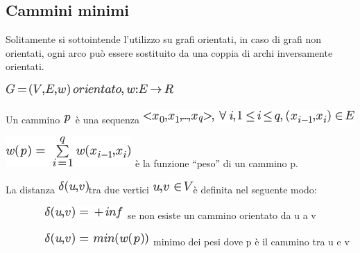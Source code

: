 \documentclass{article}
\begin{document}
{}

\subsection{\texorpdfstring{{Cammini
minimi}}{Cammini minimi}}\label{h.yl5v086nw9el}

{Solitamente si sottointende l'utilizzo su grafi orientati, in caso di
grafi non orientati, ogni arco può essere sostituito da una coppia di
archi inversamente orientati.}

{}

\includegraphics{images/image490.png}

{}

{Un cammino }\includegraphics{images/image491.png}{~è una sequenza
}\includegraphics{images/image492.png}

\includegraphics{images/image493.png}{~è la funzione ``peso'' di un
cammino p.}

{}

{La distanza }\includegraphics{images/image494.png}{tra due vertici
}\includegraphics{images/image495.png}{è definita nel seguente modo:}

{~~~~~~~~}\includegraphics{images/image496.png}{~se non esiste un
cammino orientato da u a v}

{~~~~~~~~}\includegraphics{images/image497.png}{~minimo dei pesi dove p
è il cammino tra u e v}

\subsection{\texorpdfstring{{}}{}}\label{h.h641h77p7srj}
\end{document}
